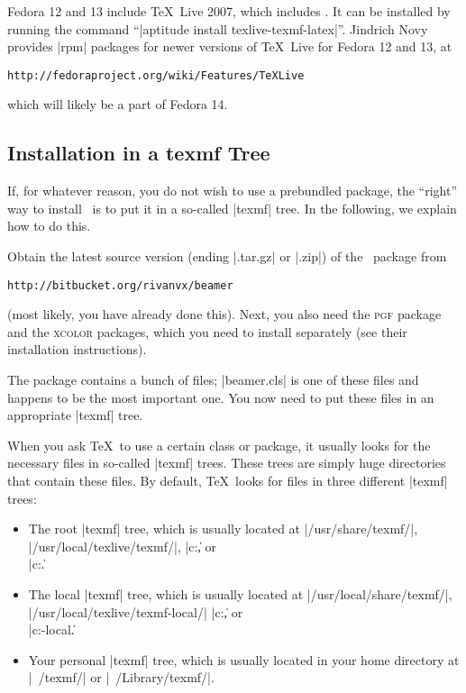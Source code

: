 Fedora 12 and 13 include \TeX\ Live 2007, which includes \beamer. It can be installed by running the command ``|aptitude install texlive-texmf-latex|''. Jindrich Novy provides |rpm| packages for newer versions of \TeX\ Live for Fedora 12 and 13, at
\begin{verbatim}
http://fedoraproject.org/wiki/Features/TeXLive
\end{verbatim}
which will likely be a part of Fedora 14.


\subsection{Installation in a texmf Tree}

If, for whatever reason, you do not wish to use a prebundled package, the ``right'' way to install \beamer\ is to put it in a so-called |texmf| tree. In the following, we explain how to do this.

Obtain the latest source version (ending |.tar.gz| or |.zip|) of the \beamer\ package from
\begin{verbatim}
http://bitbucket.org/rivanvx/beamer
\end{verbatim}
(most likely, you have already done this). Next, you also need the \textsc{pgf} package and the \textsc{xcolor} packages, which you need to install separately (see their installation instructions).

The package contains a bunch of files; |beamer.cls| is one of these files and happens to be the most important one. You now need to put these files in an appropriate |texmf| tree.

When you ask \TeX\ to use a certain class or package, it usually looks for the necessary files in so-called |texmf| trees. These trees are simply huge directories that contain these files. By default, \TeX\ looks for files in three different |texmf| trees:
\begin{itemize}
\item
  The root |texmf| tree, which is usually located at |/usr/share/texmf/|, |/usr/local/texlive/texmf/|, |c:\texmf\|, or\\ |c:\texlive\texmf\|.
\item
  The local  |texmf| tree, which is usually located at |/usr/local/share/texmf/|, |/usr/local/texlive/texmf-local/| |c:\localtexmf\|, or\\ |c:\texlive\texmf-local\|.
\item
  Your personal |texmf| tree, which is usually located in your home directory at |~/texmf/| or |~/Library/texmf/|.
\end{itemize}

